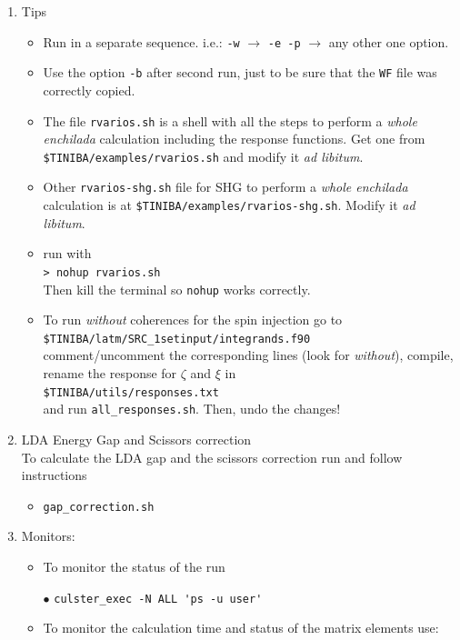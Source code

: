 \documentclass[openany,oneside]{book}
\numberwithin{equation}{section}
\begin{document}
\begin{enumerate}
\item Tips
\begin{itemize}
\item Run in a separate sequence. i.e.:
  \verb=-w= $\to$   \verb=-e -p= $\to$   any other one option.
\item Use the option \verb=-b= after second run, just to be sure that
  the \verb=WF= file was correctly copied. 
\item The file \verb=rvarios.sh= is a shell with all the steps to
  perform a {\it whole enchilada} calculation including the response
  functions. Get one from \verb=$TINIBA/examples/rvarios.sh= and
  modify it {\it ad libitum}.
\item Other \verb=rvarios-shg.sh= file for SHG to
  perform a {\it whole enchilada} calculation is at
 \verb=$TINIBA/examples/rvarios-shg.sh=.
  Modify it {\it ad libitum}.
\item run with\\ \verb=> nohup rvarios.sh=\\
Then kill the terminal so
  \verb=nohup= works correctly.
\item To run {\it without} coherences for the spin injection go to\\ 
\verb=$TINIBA/latm/SRC_1setinput/integrands.f90=\\
comment/uncomment the corresponding lines (look for {\it without}),
compile, rename the response for $\zeta$ and $\xi$ in\\
 \verb=$TINIBA/utils/responses.txt=\\
and run \verb=all_responses.sh=. Then, undo the changes!  
\end{itemize}

\item LDA Energy Gap and Scissors correction\\
To calculate the LDA gap and the scissors correction run and follow instructions
\begin{itemize}
\item \verb=gap_correction.sh=
\end{itemize}
\item Monitors:
\begin{itemize}
\item To monitor the status of the run

$\bullet$ \verb=culster_exec -N ALL 'ps -u user'=

\item To monitor the calculation time and status of the matrix
  elements use:


\end{itemize}
\end{enumerate}
\end{document}
